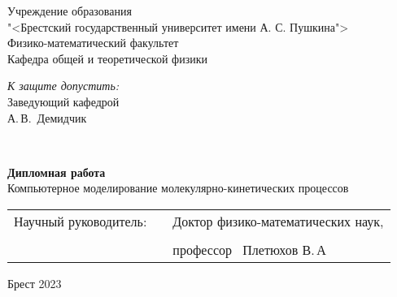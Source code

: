 \thispagestyle{empty}
\begin{center}
    Учреждение образования \\
"<Брестский государственный университет имени А. С. Пушкина"> \\
Физико-математический факультет \\
Кафедра общей и теоретической физики \\


    \vspace{20pt}
\end{center}

\begin{flushright}
    \begin{minipage}{0.4\textwidth}
      \textit{К защите допустить:}\\[0.8em]
      Заведующий кафедрой \\[0.45em]
      \underline{\hspace*{2.8cm}} А.\,В.~Демидчик
    \end{minipage}\\[2.2em]
    
  \end{flushright}

\vspace{50pt}
  \begin{center}
    \textbf{Дипломная работа} \\  
    \vspace{20pt}
  Компьютерное моделирование молекулярно-кинетических процессов
  
\end{center}
\vfill
    \vspace{20 pt}


\vspace{20 pt}
 \noindent
 \begin{tabular}{lp{4em}l}
   Научный руководитель:   &&  Доктор физико-математических наук, \\ \\
                          &&   профессор \hrulefill  ~Плетюхов В.\,А
 \end{tabular}
 \vfill
  
 \begin{center}
    {\normalsize Брест 2023}
  \end{center}
